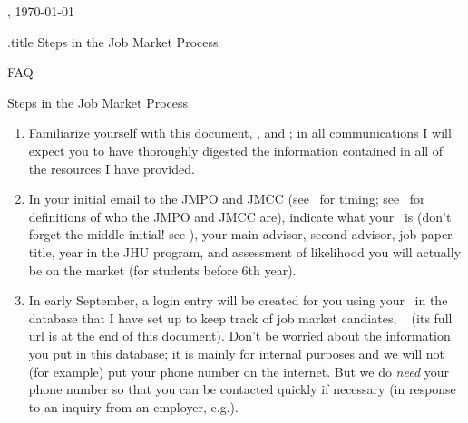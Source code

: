 \documentclass{\classes/econtex}
\begin{document}
\hfill{\tiny \jobname, \today} \vspace{0.1in}

\begin{verbatimwrite}{\jobname.title}
  Steps in the Job Market Process
\end{verbatimwrite}
FAQ
\centerline{\Large Steps in the Job Market Process}\medskip\medskip

\begin{enumerate}
\item Familiarize yourself with this document, \timet, and \faq; in all communications I will expect you
  to have thoroughly digested the information contained in all of the resources
  I have provided.

\item In your initial email to the JMPO and JMCC (see
  \timet~for timing; see \ntn~for definitions of who the JMPO and JMCC are), indicate what your \Moniker~is (don't forget the middle initial!  see \Notation), your main advisor, second advisor, job paper title,
  year in the JHU program, and assessment of likelihood you will
  actually be on the market (for students before 6th year).

  \hypertarget{jhueconpeople-data}{}
\item {} In early September, a login entry will be created for you using your \Moniker~in the database that I have set up to keep track of job market candiates, \db~ (its full url is at the end of this document).  Don't be worried about the information you put in this database; it is mainly for internal purposes and we will not (for example) put your phone number on the internet.  But we do \textit{need} your phone number so that you can be contacted quickly if necessary (in response to an inquiry from an employer, e.g.).


\end{enumerate}
\end{document}
